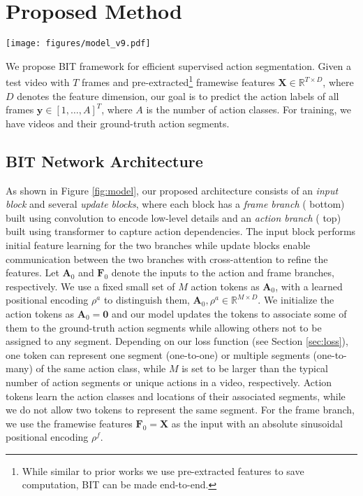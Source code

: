 \documentclass[10pt,twocolumn,letterpaper]{article}
\newcommand{\A}{\mathbf{A}}
\newcommand{\F}{\mathbf{F}}
\newcommand{\mR}{\mathbb{R}}
\newcommand{\y}{\boldsymbol{y}}
\newcommand{\0}{\boldsymbol{0}}
\begin{document}
\section{Proposed Method}

\begin{figure*}
\texttt{[image: figures/model\_v9.pdf]}
   \caption{\small Our BIT network that learns explicit action tokens to represent action segments, performs temporal modeling on action and frame levels in parallel while maintaining low computation cost.}
   \label{fig:model}
\end{figure*}

We propose BIT framework for efficient supervised action segmentation. Given a test video with $T$ frames and pre-extracted\footnote{While similar to prior works we use pre-extracted features to save computation, BIT can be made end-to-end.} framewise features $\mathbf{X} \in \mathbb{R}^{T \times D}$, where $D$ denotes the feature dimension, our goal is to predict the action labels of all frames $\y \in [1, \ldots, A]^T $, where $A$ is the number of action classes. For training, we have videos and their ground-truth action segments. 


\subsection{BIT Network Architecture}

\label{sec:model}
As shown in Figure \ref{fig:model}, our proposed architecture consists of an \emph{input block} and several \emph{update blocks}, where each block has a \emph{frame branch} ({\color{blue} bottom}) built using convolution to encode low-level details and an \emph{action branch} ({\color{green} top}) built using transformer to capture action dependencies. The input block performs initial feature learning for the two branches while update blocks enable communication between the two branches with cross-attention to refine the features.
Let $\A_0$ and $\F_0$ denote the inputs to the action and frame branches, respectively. 
We use a fixed small set of $M$ action tokens as $\A_0$, with a learned positional encoding $\rho^a$ to distinguish them, $\A_0, \rho^a \in \mR^{M \times D}$. 
We initialize the action tokens as $\A_0 = \0$ and our model updates the tokens to associate some of them to the ground-truth action segments while allowing others not to be assigned to any segment.
Depending on our loss function (see Section \ref{sec:loss}), one token can represent one segment (one-to-one) or multiple segments (one-to-many) of the same action class, while $M$ is set to be larger than the typical number of action segments or unique actions in a video, respectively. 
Action tokens learn the action classes and locations of their associated segments, while we do not allow two tokens to represent the same segment. 
For the frame branch, we use the framewise features $\F_0 = \mathbf{X}$ as the input with an absolute sinusoidal positional encoding $\rho^f$. 
\end{document}
